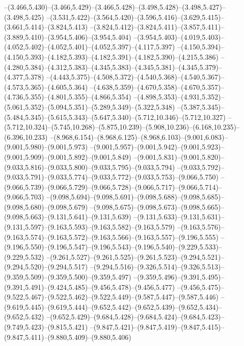   --(3.466,5.430)--(3.466,5.429)--(3.466,5.428)--(3.498,5.428)--(3.498,5.427)--(3.498,5.425)%
  --(3.531,5.422)--(3.564,5.420)--(3.596,5.416)--(3.629,5.415)--(3.661,5.414)--(3.824,5.413)%
  --(3.824,5.412)--(3.824,5.411)--(3.857,5.411)--(3.889,5.410)--(3.954,5.406)--(3.954,5.404)%
  --(3.954,5.403)--(4.019,5.403)--(4.052,5.402)--(4.052,5.401)--(4.052,5.397)--(4.117,5.397)%
  --(4.150,5.394)--(4.150,5.393)--(4.182,5.393)--(4.182,5.391)--(4.182,5.390)--(4.215,5.386)%
  --(4.280,5.384)--(4.312,5.383)--(4.345,5.383)--(4.345,5.381)--(4.345,5.379)--(4.377,5.378)%
  --(4.443,5.375)--(4.508,5.372)--(4.540,5.368)--(4.540,5.367)--(4.573,5.365)--(4.605,5.364)%
  --(4.638,5.359)--(4.670,5.358)--(4.670,5.357)--(4.736,5.355)--(4.801,5.355)--(4.866,5.354)%
  --(4.898,5.353)--(4.931,5.352)--(5.061,5.352)--(5.094,5.351)--(5.289,5.349)--(5.322,5.348)%
  --(5.387,5.345)--(5.484,5.345)--(5.615,5.343)--(5.647,5.340)--(5.712,10.346)--(5.712,10.327)%
  --(5.712,10.324)--(5.745,10.268)--(5.875,10.239)--(5.908,10.236)--(6.168,10.235)--(6.396,10.233)%
  --(8.968,6.154)--(8.968,6.125)--(8.968,6.103)--(9.001,6.083)--(9.001,5.980)--(9.001,5.973)%
  --(9.001,5.957)--(9.001,5.942)--(9.001,5.923)--(9.001,5.909)--(9.001,5.892)--(9.001,5.849)%
  --(9.001,5.831)--(9.001,5.820)--(9.033,5.816)--(9.033,5.800)--(9.033,5.795)--(9.033,5.794)%
  --(9.033,5.792)--(9.033,5.791)--(9.033,5.774)--(9.033,5.772)--(9.033,5.753)--(9.066,5.750)%
  --(9.066,5.739)--(9.066,5.729)--(9.066,5.728)--(9.066,5.717)--(9.066,5.714)--(9.066,5.703)%
  --(9.098,5.694)--(9.098,5.691)--(9.098,5.688)--(9.098,5.685)--(9.098,5.680)--(9.098,5.679)%
  --(9.098,5.675)--(9.098,5.673)--(9.098,5.665)--(9.098,5.663)--(9.131,5.641)--(9.131,5.639)%
  --(9.131,5.633)--(9.131,5.631)--(9.131,5.597)--(9.163,5.593)--(9.163,5.582)--(9.163,5.579)%
  --(9.163,5.576)--(9.163,5.574)--(9.163,5.572)--(9.163,5.566)--(9.163,5.557)--(9.196,5.555)%
  --(9.196,5.550)--(9.196,5.547)--(9.196,5.543)--(9.196,5.540)--(9.229,5.533)--(9.229,5.532)%
  --(9.261,5.527)--(9.261,5.525)--(9.261,5.523)--(9.294,5.521)--(9.294,5.520)--(9.294,5.517)%
  --(9.294,5.516)--(9.326,5.514)--(9.326,5.513)--(9.359,5.509)--(9.359,5.500)--(9.359,5.497)%
  --(9.359,5.496)--(9.391,5.495)--(9.391,5.491)--(9.424,5.485)--(9.456,5.478)--(9.456,5.477)%
  --(9.456,5.475)--(9.522,5.467)--(9.522,5.462)--(9.522,5.449)--(9.587,5.447)--(9.587,5.446)%
  --(9.619,5.445)--(9.619,5.444)--(9.652,5.442)--(9.652,5.439)--(9.652,5.434)--(9.652,5.432)%
  --(9.652,5.429)--(9.684,5.428)--(9.684,5.424)--(9.684,5.423)--(9.749,5.423)--(9.815,5.421)%
  --(9.847,5.421)--(9.847,5.419)--(9.847,5.415)--(9.847,5.411)--(9.880,5.409)--(9.880,5.406)%
